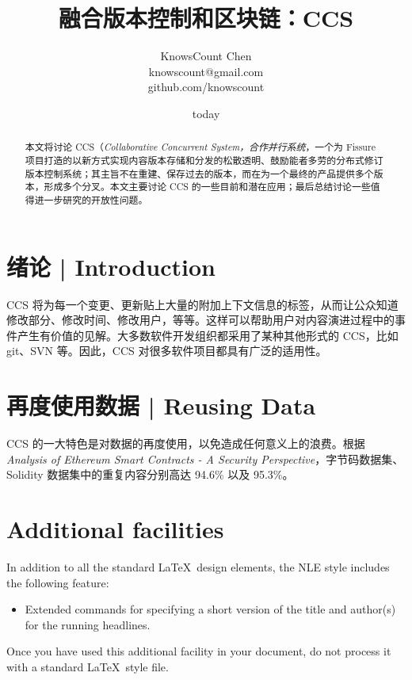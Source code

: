 \documentclass{cnle}
\title[Version Control, Blockchain, and CCS]
      {融合版本控制和区块链：CCS}
\author[KnowsCount]
       {KnowsCount Chen\\
        knowscount@gmail.com\\
        github.com/knowscount}
\date{today}
\begin{document}
\label{firstpage}
\maketitle

\begin{abstract}
本文将讨论 CCS（{\em Collaborative Concurrent System，合作并行系统\/}，一个为 Fissure 项目打造的以新方式实现内容版本存储和分发的松散透明、鼓励能者多劳的分布式修订版本控制系统；其主旨不在重建、保存过去的版本，而在为一个最终的产品提供多个版本，形成多个分叉。本文主要讨论 CCS 的一些目前和潜在应用；最后总结讨论一些值得进一步研究的开放性问题。
\end{abstract}

\section{绪论 | Introduction}

CCS 将为每一个变更、更新贴上大量的附加上下文信息的标签，从而让公众知道修改部分、修改时间、修改用户，等等。这样可以帮助用户对内容演进过程中的事件产生有价值的见解。大多数软件开发组织都采用了某种其他形式的 CCS，比如 git、SVN 等。因此，CCS 对很多软件项目都具有广泛的适用性。

\section{再度使用数据 | Reusing Data}

CCS 的一大特色是对数据的再度使用，以免造成任何意义上的浪费。根据 {\em Analysis of Ethereum Smart Contracts - A Security Perspective\/}，字节码数据集、Solidity 数据集中的重复内容分别高达 94.6\% 以及 95.3\%。



\section{Additional facilities}

In addition to all the standard \LaTeX\ design elements, the NLE style
includes the following feature:
\begin{itemize}
  \item Extended commands for specifying a short version
        of the title and author(s) for the running
        headlines.
\end{itemize}
Once you have used this additional facility in your document,
do not process it with a standard \LaTeX\ style file.
\end{document}
